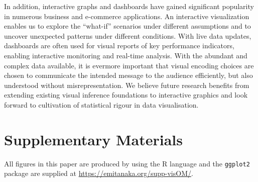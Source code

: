 \documentclass[ijds,nonblindrev]{informs-ijds}
\begin{document}
In addition, interactive graphs and dashboards have gained significant popularity in numerous business and e-commerce applications. An interactive visualization enables us to explore the “what-if” scenarios under different assumptions and to uncover unexpected patterns under different conditions. With live data updates, dashboards are often used for visual reports of key performance indicators, enabling interactive monitoring and real-time analysis. With the abundant and complex data available, it is evermore important that visual encoding choices are chosen to communicate the intended message to the audience efficiently, but also understood without misrepresentation. We believe future research benefits from extending existing visual inference foundations to interactive graphics \citep{Cook2021Foundation} and look forward to cultivation of statistical rigour in data visualisation.



\section*{Supplementary Materials}\label{sec:supp}

All figures in this paper are produced by using the R language \citep{rstats} and the \texttt{ggplot2} package \citep{ggplot2} are supplied at \url{https://emitanaka.org/supp-visOM/}.




\end{document}

